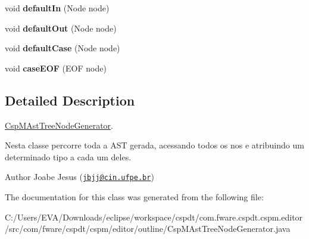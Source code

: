 \begin{DoxyCompactItemize}
void {\bfseries default\+In} (Node node)
\item 
\mbox{\label{classcom_1_1fware_1_1cspdt_1_1cspm_1_1editor_1_1outline_1_1_csp_m_ast_tree_node_generator_a030383da7c07611fb78217ec93b893f6}} 
void {\bfseries default\+Out} (Node node)
\item 
\mbox{\label{classcom_1_1fware_1_1cspdt_1_1cspm_1_1editor_1_1outline_1_1_csp_m_ast_tree_node_generator_a129fcec85ec978e230f77ffd1d59a3d8}} 
void {\bfseries default\+Case} (Node node)
\item 
\mbox{\label{classcom_1_1fware_1_1cspdt_1_1cspm_1_1editor_1_1outline_1_1_csp_m_ast_tree_node_generator_a5aa68001e09e9cfe646f5cca37c265d9}} 
void {\bfseries case\+E\+OF} (E\+OF node)
\end{DoxyCompactItemize}


\subsection{Detailed Description}
\hyperlink{classcom_1_1fware_1_1cspdt_1_1cspm_1_1editor_1_1outline_1_1_csp_m_ast_tree_node_generator}{Csp\+M\+Ast\+Tree\+Node\+Generator}. 

Nesta classe percorre toda a A\+ST gerada, acessando todos os nos e atribuindo um determinado tipo a cada um deles. \begin{DoxyAuthor}{Author}
Joabe Jesus (\href{mailto:jbjj@cin.ufpe.br}{\tt jbjj@cin.\+ufpe.\+br}) 
\end{DoxyAuthor}


The documentation for this class was generated from the following file\+:\begin{DoxyCompactItemize}
\item 
C\+:/\+Users/\+E\+V\+A/\+Downloads/eclipse/workspace/cspdt/com.\+fware.\+cspdt.\+cspm.\+editor/src/com/fware/cspdt/cspm/editor/outline/Csp\+M\+Ast\+Tree\+Node\+Generator.\+java\end{DoxyCompactItemize}
